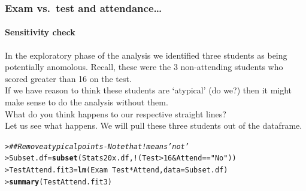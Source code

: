 \documentclass{beamer}\usepackage[]{graphicx}\usepackage[]{xcolor}
\makeatletter
\newcommand{\hlnum}[1]{\textcolor[rgb]{0.686,0.059,0.569}{#1}}%
\newcommand{\hlstr}[1]{\textcolor[rgb]{0.192,0.494,0.8}{#1}}%
\newcommand{\hlcom}[1]{\textcolor[rgb]{0.678,0.584,0.686}{\textit{#1}}}%
\newcommand{\hlopt}[1]{\textcolor[rgb]{0,0,0}{#1}}%
\newcommand{\hlstd}[1]{\textcolor[rgb]{0.345,0.345,0.345}{#1}}%
\newcommand{\hlkwb}[1]{\textcolor[rgb]{0.69,0.353,0.396}{#1}}%
\newcommand{\hlkwc}[1]{\textcolor[rgb]{0.333,0.667,0.333}{#1}}%
\newcommand{\hlkwd}[1]{\textcolor[rgb]{0.737,0.353,0.396}{\textbf{#1}}}%
\newenvironment{kframe}{%
 \def\at@end@of@kframe{}%
 \ifinner\ifhmode%
  \def\at@end@of@kframe{\end{minipage}}%
  \begin{minipage}{\columnwidth}%
 \fi\fi%
 \def\FrameCommand##1{\hskip\@totalleftmargin \hskip-\fboxsep
 \colorbox{shadecolor}{##1}\hskip-\fboxsep
     \hskip-\linewidth \hskip-\@totalleftmargin \hskip\columnwidth}%
 \MakeFramed {\advance\hsize-\width
   \@totalleftmargin\z@ \linewidth\hsize
   \@setminipage}}%
 {\par\unskip\endMakeFramed%
 \at@end@of@kframe}
\newenvironment{knitrout}{}{} %
\makeatother
\begin{document}


\begin{frame}[fragile]
\frametitle{Exam vs.\ test \textbf{and} attendance\ldots}
\framesubtitle{Sensitivity check}

In the exploratory phase of the analysis we identified three students as being potentially anomolous. Recall, these were the 3 non-attending students who scored greater than 16 on the test.\\
\bigskip
If we have reason to think these students are `atypical' (do we?) then it might make sense to do the analysis without them.\\ 
\bigskip
What do you think happens to our respective straight lines?\\
\bigskip
Let us see what happens. We will pull these three students out of the dataframe. 
\medskip
\begin{knitrout}\scriptsize
{}\color{fgcolor}\begin{kframe}
\begin{alltt}
\hlstd{> }\hlcom{## Remove atypical points - Note that ! means 'not'}
\hlstd{> }\hlstd{Subset.df}\hlkwb{=}\hlkwd{subset}\hlstd{(Stats20x.df,} \hlopt{!}\hlstd{(Test}\hlopt{>}\hlnum{16}\hlopt{&}\hlstd{Attend}\hlopt{==}\hlstr{"No"}\hlstd{))}
\hlstd{> }\hlstd{TestAttend.fit3}\hlkwb{=}\hlkwd{lm}\hlstd{(Exam} \hlopt{~}\hlstd{Test}\hlopt{*}\hlstd{Attend,} \hlkwc{data}\hlstd{=Subset.df)}
\hlstd{> }\hlkwd{summary}\hlstd{(TestAttend.fit3)}
\end{alltt}
\end{kframe}
\end{knitrout}
\end{frame}
\end{document}
